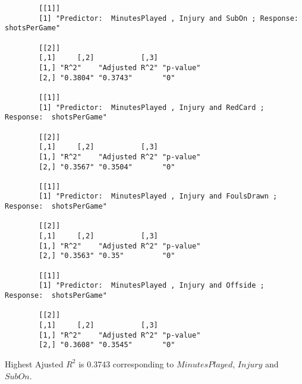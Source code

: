 \documentclass[12pt]{article}
\begin{document}
\begin{verbatim}
		[[1]]
		[1] "Predictor:  MinutesPlayed , Injury and SubOn ; Response:  shotsPerGame"
		
		[[2]]
		[,1]     [,2]           [,3]     
		[1,] "R^2"    "Adjusted R^2" "p-value"
		[2,] "0.3804" "0.3743"       "0"      
		
		[[1]]
		[1] "Predictor:  MinutesPlayed , Injury and RedCard ; Response:  shotsPerGame"
		
		[[2]]
		[,1]     [,2]           [,3]     
		[1,] "R^2"    "Adjusted R^2" "p-value"
		[2,] "0.3567" "0.3504"       "0"      
		
		[[1]]
		[1] "Predictor:  MinutesPlayed , Injury and FoulsDrawn ; Response:  shotsPerGame"
		
		[[2]]
		[,1]     [,2]           [,3]     
		[1,] "R^2"    "Adjusted R^2" "p-value"
		[2,] "0.3563" "0.35"         "0"      
		
		[[1]]
		[1] "Predictor:  MinutesPlayed , Injury and Offside ; Response:  shotsPerGame"
		
		[[2]]
		[,1]     [,2]           [,3]     
		[1,] "R^2"    "Adjusted R^2" "p-value"
		[2,] "0.3608" "0.3545"       "0"   
	\end{verbatim}
	Highest Ajusted $ R^2 $ is 0.3743 corresponding to $ MinutesPlayed $, $ Injury $ and $ SubOn $.
	
\end{document}
